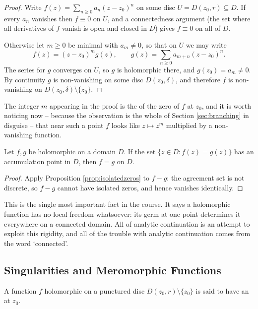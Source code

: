 \documentclass[a4paper]{scrartcl}
\begin{document}
\begin{proof}
	Write $f(z) = \sum_{n \geq 0} a_n (z - z_0)^n$ on some disc $U = D(z_0, r) \subseteq D$.
	If every $a_n$ vanishes then $f \equiv 0$ on $U$, and a connectedness argument (the set
	where all derivatives of $f$ vanish is open and closed in $D$) gives $f \equiv 0$ on all
	of $D$.

	Otherwise let $m \geq 0$ be minimal with $a_m \neq 0$, so that on $U$ we may write
	$$
	f(z) = (z - z_0)^m g(z), \qquad g(z) = \sum_{n \geq 0} a_{m + n}(z - z_0)^n.
	$$
	The series for $g$ converges on $U$, so $g$ is holomorphic there, and $g(z_0) = a_m \neq 0$.
	By continuity $g$ is non-vanishing on some disc $D(z_0, \delta)$, and therefore $f$ is
	non-vanishing on $D(z_0,\delta) \setminus \{z_0\}$.
\end{proof}

The integer $m$ appearing in the proof is the  of the zero of $f$ at $z_0$,
and it is worth noticing now -- because the observation is the whole of Section
\ref{sec:branching} in disguise -- that near such a point $f$ looks like $z \mapsto z^m$
multiplied by a non-vanishing function.

\begin{corollary}\label{cor:identity}
	Let $f, g$ be holomorphic on a domain $D$. If the set $\{z \in D : f(z) = g(z)\}$ has
	an accumulation point in $D$, then $f = g$ on $D$.
\end{corollary}

\begin{proof}
	Apply Proposition \ref{prop:isolatedzeros} to $f - g$: the agreement set is not
	discrete, so $f - g$ cannot have isolated zeros, and hence vanishes identically.
\end{proof}

This is the single most important fact in the course. It says a holomorphic function has
no local freedom whatsoever: its germ at one point determines it everywhere on a
connected domain. All of analytic continuation is an attempt to exploit this rigidity,
and all of the trouble with analytic continuation comes from the word `connected'.

\subsection{Singularities and Meromorphic Functions}

\begin{definition}
	A function $f$ holomorphic on a punctured disc $D(z_0, r) \setminus \{z_0\}$ is said
	to have an  at $z_0$.
\end{definition}
\end{document}
